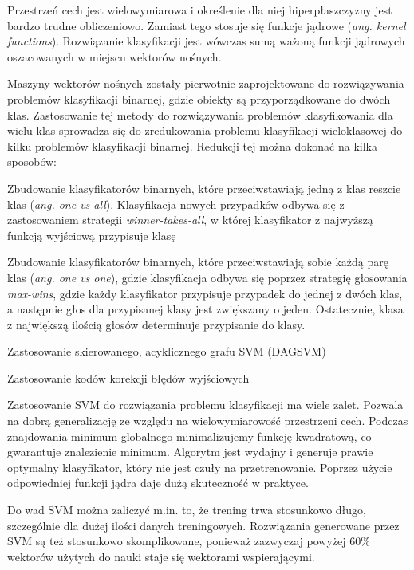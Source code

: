 Przestrzeń cech jest wielowymiarowa i określenie dla niej hiperpłaszczyzny jest bardzo trudne obliczeniowo. Zamiast tego stosuje się funkcje jądrowe (\emph{ang. kernel functions}). Rozwiązanie klasyfikacji jest wówczas sumą ważoną funkcji jądrowych oszacowanych w miejscu wektorów nośnych.

Maszyny wektorów nośnych zostały pierwotnie zaprojektowane do rozwiązywania problemów klasyfikacji binarnej, gdzie obiekty są przyporządkowane do dwóch klas. Zastosowanie tej metody do rozwiązywania problemów klasyfikowania dla wielu klas sprowadza się do zredukowania problemu klasyfikacji wieloklasowej do kilku problemów klasyfikacji binarnej.\cite{DUAN05} Redukcji tej można dokonać na kilka sposobów:

\begin{compactitem}
	\item Zbudowanie klasyfikatorów binarnych, które przeciwstawiają jedną z klas reszcie klas (\emph{ang. one vs all}). Klasyfikacja nowych przypadków odbywa się z zastosowaniem strategii \emph{winner-takes-all}, w której klasyfikator z najwyższą funkcją wyjściową przypisuje klasę
	\item Zbudowanie klasyfikatorów binarnych, które przeciwstawiają sobie każdą parę klas (\emph{ang. one vs one}), gdzie klasyfikacja odbywa się poprzez strategię głosowania \emph{max-wins}, gdzie każdy klasyfikator przypisuje przypadek do jednej z dwóch klas, a następnie głos dla przypisanej klasy jest zwiększany o jeden. Ostatecznie, klasa z największą ilością głosów determinuje przypisanie do klasy.
	\item Zastosowanie skierowanego, acyklicznego grafu SVM (DAGSVM)\cite{PLATT00}
	\item Zastosowanie kodów korekcji błędów wyjściowych\cite{DIETTERICH94}
\end{compactitem}

Zastosowanie SVM do rozwiązania problemu klasyfikacji ma wiele zalet. Pozwala na dobrą generalizację ze względu na wielowymiarowość przestrzeni cech. Podczas znajdowania minimum globalnego minimalizujemy funkcję kwadratową, co gwarantuje znalezienie minimum. Algorytm jest wydajny i generuje prawie optymalny klasyfikator, który nie jest czuły na przetrenowanie. Poprzez użycie odpowiedniej funkcji jądra daje dużą skuteczność w praktyce.\cite{WOLTER07}

Do wad SVM można zaliczyć m.in. to, że trening trwa stosunkowo długo, szczególnie dla dużej ilości danych treningowych. Rozwiązania generowane przez SVM są też stosunkowo skomplikowane, ponieważ zazwyczaj powyżej 60\% wektorów użytych do nauki staje się wektorami wspierającymi.\cite{WOLTER07}

